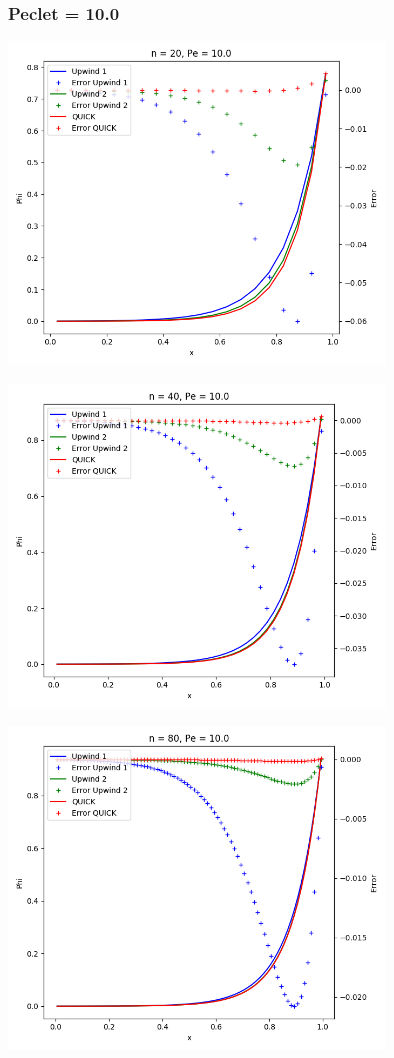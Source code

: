 \documentclass[11pt]{article}
\begin{document}
\subsubsection{Peclet = 10.0}
\label{sec:org67d9f2b}
\begin{center}
\includegraphics[width=10cm]{./figures/n20pe10.png}
\end{center}

\begin{center}
\includegraphics[width=10cm]{./figures/n40pe10.png}
\end{center}

\begin{center}
\includegraphics[width=10cm]{./figures/n80pe10.png}
\end{center}
\end{document}
